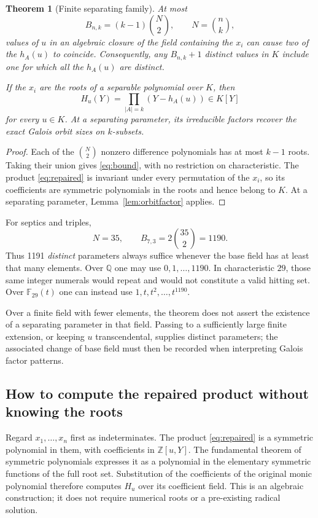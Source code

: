 \documentclass[11pt,a4paper]{article}
\newtheorem{theorem}{Theorem}[section]
\theoremstyle{definition}
\theoremstyle{remark}
\newcommand{\Q}{\mathbb Q}
\newcommand{\Z}{\mathbb Z}
\newcommand{\F}{\mathbb F}
\begin{document}
\begin{theorem}[Finite separating family]\label{thm:repair}
At most
\begin{equation}
 B_{n,k}=(k-1)\binom{N}{2},\qquad N=\binom nk,
 \label{eq:bound}
\end{equation}
values of $u$ in an algebraic closure of the field containing the $x_i$
can cause two of the $h_A(u)$ to
coincide. Consequently, any $B_{n,k}+1$ distinct values in $K$ include one
for which all the $h_A(u)$ are distinct.

If the $x_i$ are the roots of a separable polynomial over $K$, then
\begin{equation}
 H_u(Y)=\prod_{|A|=k}(Y-h_A(u))\in K[Y]
 \label{eq:repaired}
\end{equation}
for every $u\in K$. At a separating parameter, its irreducible factors
recover the exact Galois orbit sizes on $k$-subsets.
\end{theorem}
\begin{proof}
Each of the $\binom N2$ nonzero difference polynomials has at most $k-1$
roots. Taking their union gives \eqref{eq:bound}, with no restriction on
characteristic. The product \eqref{eq:repaired} is invariant under every
permutation of the $x_i$, so its coefficients are symmetric polynomials in
the roots and hence belong to $K$. At a separating parameter,
Lemma~\ref{lem:orbitfactor} applies.
\end{proof}

For septics and triples,
\[
 N=35,\qquad B_{7,3}=2\binom{35}{2}=1190.
\]
Thus 1191 \emph{distinct} parameters always suffice whenever the base field
has at least that many elements. Over $\Q$ one may use $0,1,\ldots,1190$.
In characteristic $29$, those same integer numerals would repeat and would
not constitute a valid hitting set. Over $\F_{29}(t)$ one can instead use
$1,t,t^2,\ldots,t^{1190}$.

Over a finite field with fewer elements, the theorem does not assert the
existence of a separating parameter in that field. Passing to a sufficiently
large finite extension, or keeping $u$ transcendental, supplies distinct
parameters; the associated change of base field must then be recorded when
interpreting Galois factor patterns.

\subsection{How to compute the repaired product without knowing the roots}

Regard $x_1,\ldots,x_n$ first as indeterminates. The product
\eqref{eq:repaired} is a symmetric polynomial in them, with coefficients
in $\Z[u,Y]$. The fundamental theorem of symmetric polynomials expresses
it as a polynomial in the elementary symmetric functions of the full root
set. Substitution of the coefficients of the original monic polynomial
therefore computes $H_u$ over its coefficient field. This is an algebraic
construction; it does not require numerical roots or a pre-existing
radical solution.
\end{document}
